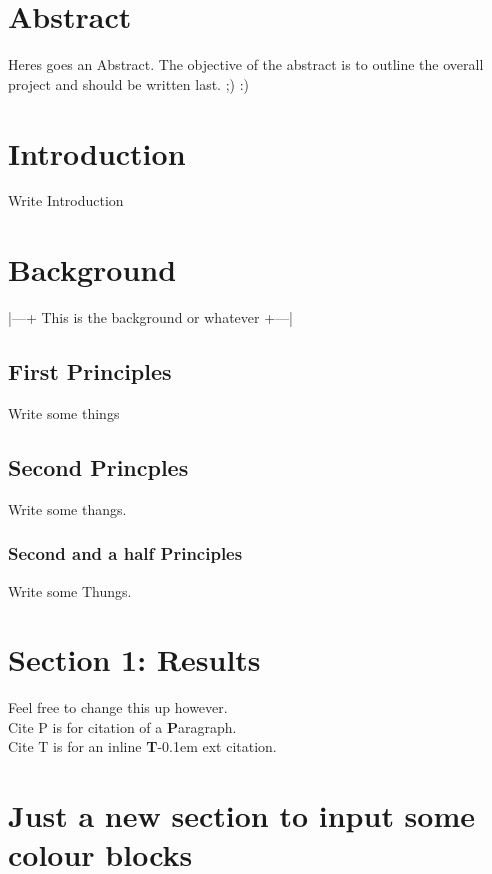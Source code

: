 




\section*{Abstract}
Heres goes an Abstract. The objective of the abstract is to outline the overall project and should be written last. ;) :)

\tableofcontents
\clearpage
{}
\section{Introduction}
Write Introduction
\R \I \C \Z

\section{Background}
|---+ This is the background or whatever +---|

\subsection{First Principles}
Write some things

\subsection{Second Princples}
Write some thangs.

\subsubsection{Second and a half Principles}
Write some Thungs.


\section{Section 1: Results}
Feel free to change this up however. \\
\citep{harris2004} Cite P is for citation of a \textbf{P}aragraph.\\
\citet{harris2021} Cite T is for an inline \textbf{T}\kern -0.1em ext citation.

\section{Just a new section to input some colour blocks}

\clearpage


